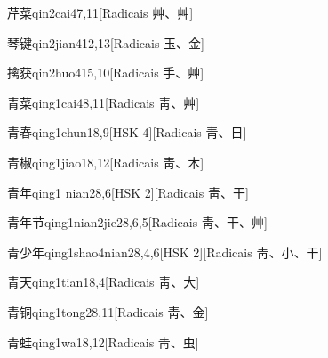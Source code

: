 \begin{entry}{芹菜}{qin2cai4}{7,11}[Radicais ⾋、⾋]
\end{entry}

\begin{entry}{琴键}{qin2jian4}{12,13}[Radicais ⽟、⾦]
\end{entry}

\begin{entry}{擒获}{qin2huo4}{15,10}[Radicais ⼿、⾋]
\end{entry}

\begin{entry}{青菜}{qing1cai4}{8,11}[Radicais ⾭、⾋]
\end{entry}

\begin{entry}{青春}{qing1chun1}{8,9}[HSK 4][Radicais ⾭、⽇]
\end{entry}

\begin{entry}{青椒}{qing1jiao1}{8,12}[Radicais ⾭、⽊]
\end{entry}

\begin{entry}{青年}{qing1 nian2}{8,6}[HSK 2][Radicais ⾭、⼲]
\end{entry}

\begin{entry}{青年节}{qing1nian2jie2}{8,6,5}[Radicais ⾭、⼲、⾋]
\end{entry}

\begin{entry}{青少年}{qing1shao4nian2}{8,4,6}[HSK 2][Radicais ⾭、⼩、⼲]
\end{entry}

\begin{entry}{青天}{qing1tian1}{8,4}[Radicais ⾭、⼤]
\end{entry}

\begin{entry}{青铜}{qing1tong2}{8,11}[Radicais ⾭、⾦]
\end{entry}

\begin{entry}{青蛙}{qing1wa1}{8,12}[Radicais ⾭、⾍]
\end{entry}

